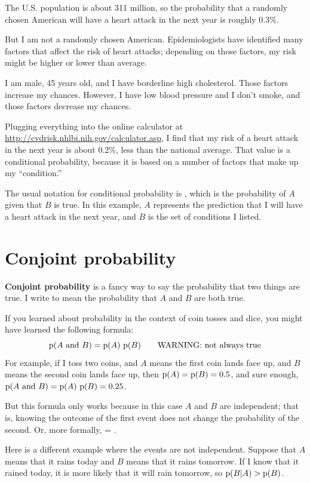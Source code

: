 \documentclass[12pt]{book}
\begin{document}
The U.S. population is about 311 million, so the probability that a
randomly chosen American will have a heart attack in the next year is
roughly 0.3\%.

But I am not a randomly chosen American.  Epidemiologists have
identified many factors that affect the risk of heart attacks;
depending on those factors, my risk might be higher or lower than
average.

I am male, 45 years old, and I have borderline high cholesterol.
Those factors increase my chances.  However, I have low blood pressure
and I don't smoke, and those factors decrease my chances.

Plugging everything into the online calculator at
\url{http://cvdrisk.nhlbi.nih.gov/calculator.asp}, I find that my
risk of a heart attack in the next year is about 0.2\%, less than the
national average.  That value is a conditional probability, because it
is based on a number of factors that make up my ``condition.''

The usual notation for conditional probability is , which
is the probability of $A$ given that $B$ is true.  In this
example, $A$ represents the prediction that I will have a heart
attack in the next year, and $B$ is the set of conditions I listed.


\section{Conjoint probability}

{\bf Conjoint probability} is a fancy way to say the probability that
two things are true.  I write  to mean the
probability that $A$ and $B$ are both true.

If you learned about probability in the context of coin tosses and
dice, you might have learned the following formula:
%
\[ \mathrm{p}(A ~\mathrm{and}~ B) = \mathrm{p}(A)~\mathrm{p}(B) \quad\quad\mbox{WARNING: not always true}\]
%
For example, if I toss two coins, and $A$ means the first coin lands
face up, and $B$ means the second coin lands face up, then $\mathrm{p}(A) =
\mathrm{p}(B) = 0.5$, and sure enough, $\mathrm{p}(A ~\mathrm{and}~ B) = \mathrm{p}(A)~\mathrm{p}(B) = 0.25$.

But this formula only works because in this case $A$ and $B$ are
independent; that is, knowing the outcome of the first event does
not change the probability of the second.  Or, more formally,
 = .

Here is a different example where the events are not independent.
Suppose that $A$ means that it rains today and $B$ means that it
rains tomorrow.  If I know that it rained today, it is more likely
that it will rain tomorrow, so $\mathrm{p}(B|A) > \mathrm{p}(B)$.
\end{document}
